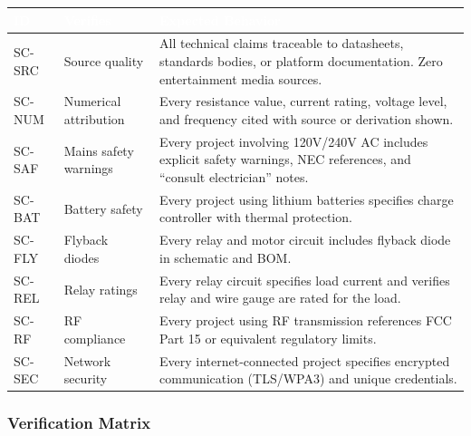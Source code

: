 \documentclass[11pt,letterpaper]{article}
\newcommand{\tableheader}[1]{\textbf{\sffamily\textcolor{white}{#1}}}
\begin{document}
\begin{center}
\begin{tabularx}{\textwidth}{C{1.2cm}L{3cm}X}
\toprule
{}
\tableheader{ID} & \tableheader{Verifies} & \tableheader{Expected Behavior} \\
\midrule
SC-SRC & Source quality & All technical claims traceable to datasheets, standards bodies, or platform documentation. Zero entertainment media sources. \\
SC-NUM & Numerical attribution & Every resistance value, current rating, voltage level, and frequency cited with source or derivation shown. \\
SC-SAF & Mains safety warnings & Every project involving 120V/240V AC includes explicit safety warnings, NEC references, and ``consult electrician'' notes. \\
SC-BAT & Battery safety & Every project using lithium batteries specifies charge controller with thermal protection. \\
SC-FLY & Flyback diodes & Every relay and motor circuit includes flyback diode in schematic and BOM. \\
SC-REL & Relay ratings & Every relay circuit specifies load current and verifies relay and wire gauge are rated for the load. \\
SC-RF & RF compliance & Every project using RF transmission references FCC Part 15 or equivalent regulatory limits. \\
SC-SEC & Network security & Every internet-connected project specifies encrypted communication (TLS/WPA3) and unique credentials. \\
\bottomrule
\end{tabularx}
\end{center}

\subsubsection{Verification Matrix}
\end{document}
